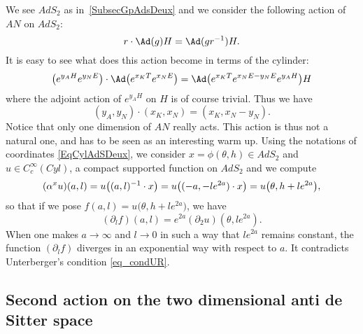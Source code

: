 We see $AdS_2$ as in~\ref{SubsecGpAdsDeux} and we consider the following action of $AN$ on $AdS_2$:
\[
  r\cdot\Ad(g)H=\Ad(gr^{-1})H.
\]
It is easy to see what does this action become in terms of the cylinder:
\[
  \big(  e^{y_AH} e^{y_NE} \big)\cdot \Ad\big(  e^{x_KT} e^{x_NE} \big)
	=\Ad\big(   e^{x_KT} e^{x_NE-y_NE} e^{y_AH}  \big)H
\]
where the adjoint action of $ e^{y_AH}$ on $H$ is of course trivial. Thus we have
\begin{equation}
(y_A,y_N)\cdot (x_K,x_N)=(x_K,x_N-y_N).
\end{equation}
Notice that only one dimension of $AN$ really acts. This action is thus not a natural one, and has to be seen as an interesting warm up. Using the notations of coordinates \eqref{EqCylAdSDeux}, we consider $x=\phi(\theta,h)\in AdS_2$ and $u\in  C^{\infty}_c(Cyl)$, a compact supported function on $AdS_2$ and we compute
\[
(\alpha^xu)(a,l)=u\big( (a,l)^{-1}\cdot x \big)\\
		=u\big( (-a,-l  e^{2a})\cdot x \big)\\
		=u\big( \theta,h+l e^{2a} \big),
\]
so that if we pose $f(a,l)=u\big( \theta,h+l e^{2a} \big)$, we have
\[
  (\partial_lf)(a,l)= e^{2a}(\partial_2u)(\theta,l e^{2a}).
\]
When one makes $a\to\infty$ and $l\to 0$ in such a way that $l e^{2a}$ remains constant, the function $(\partial_lf)$ diverges in an exponential way with respect to $a$. It contradicts Unterberger's condition \eqref{eq_condUR}.

\subsection{Second action on the two dimensional anti de Sitter space}

